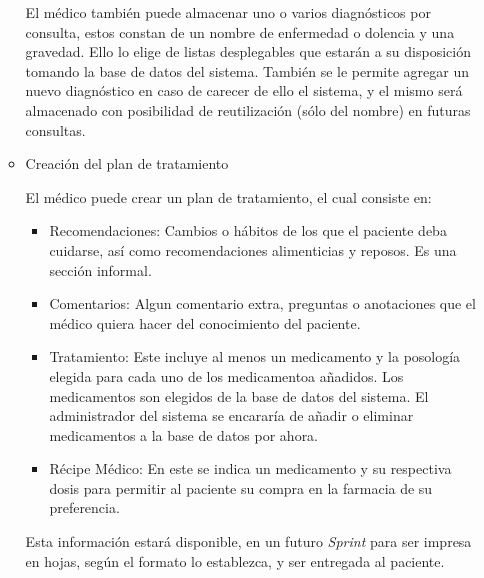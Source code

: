 \begin{enumerate}
\begin{itemize}
            El médico también puede almacenar uno o varios diagnósticos por consulta, estos constan de un nombre de enfermedad o dolencia y una gravedad. Ello lo elige de listas desplegables que estarán a su disposición tomando la base de datos del sistema. También se le permite agregar un nuevo diagnóstico en caso de carecer de ello el sistema, y el mismo será almacenado con posibilidad de reutilización (sólo del nombre) en futuras consultas.
            
            \item Creación del plan de tratamiento
            
            El médico puede crear un plan de tratamiento, el cual consiste en:
            \begin{itemize}
                \item Recomendaciones: Cambios o hábitos de los que el paciente deba cuidarse, así como recomendaciones alimenticias y reposos. Es una sección informal.
                \item Comentarios: Algun comentario extra, preguntas o anotaciones que el médico quiera hacer del conocimiento del paciente.
                \item Tratamiento: Este incluye al menos un medicamento y la posología elegida para cada uno de los medicamentoa añadidos. Los medicamentos son elegidos de la base de datos del sistema. El administrador del sistema se encararía de añadir o eliminar medicamentos a la base de datos por ahora.
                \item Récipe Médico: En este se indica un medicamento y su respectiva dosis para permitir al paciente su compra en la farmacia de su preferencia.
            \end{itemize}
            
            Esta información estará disponible, en un futuro \textit{Sprint} para ser impresa en hojas, según el formato lo establezca, y ser entregada al paciente.
            
        \end{itemize}
    \end{enumerate}
        
        
